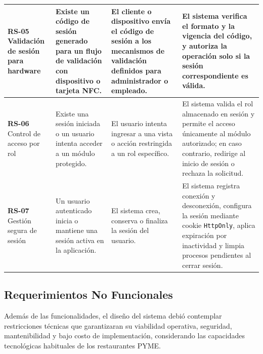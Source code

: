 \begin{longtable}{|p{2.4cm}|p{4cm}|p{4cm}|p{4.5cm}|}
	\textbf{RS-05} \newline Validación de sesión para hardware
	&
	Existe un código de sesión generado para un flujo de validación con dispositivo o tarjeta NFC.
	&
	El cliente o dispositivo envía el código de sesión a los mecanismos de validación definidos para administrador o empleado.
	&
	El sistema verifica el formato y la vigencia del código, y autoriza la operación solo si la sesión correspondiente es válida.
	\\
	\hline
	
	\textbf{RS-06} \newline Control de acceso por rol
	&
	Existe una sesión iniciada o un usuario intenta acceder a un módulo protegido.
	&
	El usuario intenta ingresar a una vista o acción restringida a un rol específico.
	&
	El sistema valida el rol almacenado en sesión y permite el acceso únicamente al módulo autorizado; en caso contrario, redirige al inicio de sesión o rechaza la solicitud.
	\\
	\hline
	
	\textbf{RS-07} \newline Gestión segura de sesión
	&
	Un usuario autenticado inicia o mantiene una sesión activa en la aplicación.
	&
	El sistema crea, conserva o finaliza la sesión del usuario.
	&
	El sistema registra conexión y desconexión, configura la sesión mediante cookie \texttt{HttpOnly}, aplica expiración por inactividad y limpia procesos pendientes al cerrar sesión.
	\\
	\hline
	
\end{longtable}


\subsection{Requerimientos No Funcionales}

Además de las funcionalidades, el diseño del sistema debió contemplar restricciones técnicas que garantizaran su viabilidad operativa, seguridad, mantenibilidad y bajo costo de implementación, considerando las capacidades tecnológicas habituales de los restaurantes PYME.

